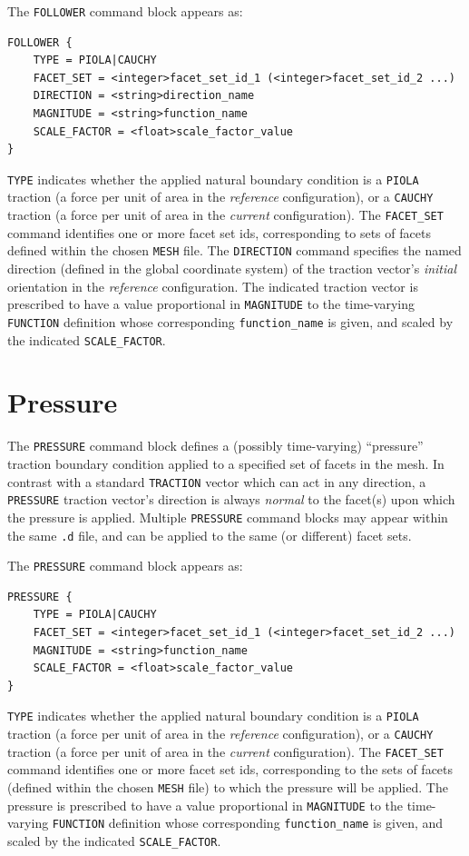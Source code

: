 \documentclass[11pt]{article} %
\begin{document}
The \texttt{FOLLOWER} command block appears as:
\begin{lstlisting}
FOLLOWER {
	TYPE = PIOLA|CAUCHY
	FACET_SET = <integer>facet_set_id_1 (<integer>facet_set_id_2 ...)
	DIRECTION = <string>direction_name
	MAGNITUDE = <string>function_name
	SCALE_FACTOR = <float>scale_factor_value
}
\end{lstlisting}
\texttt{TYPE} indicates whether the applied natural boundary condition is a \texttt{PIOLA} traction (a force per unit of area in the \textit{reference} configuration), or a \texttt{CAUCHY} traction (a force per unit of area in the \textit{current} configuration). The \texttt{FACET\_SET} command identifies one or more facet set ids, corresponding to sets of facets defined within the chosen \texttt{MESH} file. The \texttt{DIRECTION} command specifies the named direction (defined in the global coordinate system) of the traction vector's \textit{initial} orientation in the \textit{reference} configuration. The indicated traction vector is prescribed to have a value proportional in \texttt{MAGNITUDE} to the time-varying \texttt{FUNCTION} definition whose corresponding \texttt{function\_name} is given, and scaled by the indicated \texttt{SCALE\_FACTOR}.

\section{Pressure} \label{pressure_section} The \texttt{PRESSURE} command block defines a (possibly time-varying) ``pressure'' traction boundary condition applied to a specified set of facets in the mesh. In contrast with a standard \texttt{TRACTION} vector which can act in any direction, a \texttt{PRESSURE} traction vector's direction is always \textit{normal} to the facet(s) upon which the pressure is applied. Multiple \texttt{PRESSURE} command blocks may appear within the same \texttt{.d} file, and can be applied to the same (or different) facet sets.

The \texttt{PRESSURE} command block appears as:
\begin{lstlisting}
PRESSURE {
	TYPE = PIOLA|CAUCHY
	FACET_SET = <integer>facet_set_id_1 (<integer>facet_set_id_2 ...)
	MAGNITUDE = <string>function_name
	SCALE_FACTOR = <float>scale_factor_value
}
\end{lstlisting}
\texttt{TYPE} indicates whether the applied natural boundary condition is a \texttt{PIOLA} traction (a force per unit of area in the \textit{reference} configuration), or a \texttt{CAUCHY} traction (a force per unit of area in the \textit{current} configuration). The \texttt{FACET\_SET} command identifies one or more facet set ids, corresponding to the sets of facets (defined within the chosen \texttt{MESH} file) to which the pressure will be applied. The pressure is prescribed to have a value proportional in \texttt{MAGNITUDE} to the time-varying \texttt{FUNCTION} definition whose corresponding \texttt{function\_name} is given, and scaled by the indicated \texttt{SCALE\_FACTOR}.
\end{document}
